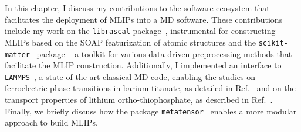 In this chapter, I discuss my contributions to the software ecosystem that facilitates the deployment of MLIPs into a MD software.
These contributions include my work on the \texttt{librascal} package~\cite{LIBRASCAL}, instrumental for constructing MLIPs based on the SOAP featurization of atomic structures and the \texttt{scikit-matter}~\cite{goscinski2023scikit} package -- a toolkit for various data-driven preprocessing methods that facilitate the MLIP construction. %
Additionally, I implemented an interface to \texttt{LAMMPS}~\cite{LAMMPS}, a state of the art classical MD code, enabling the studies on ferroelectric phase transitions in barium titanate, as detailed in Ref.~\cite{gigli2023modeling} and on the transport properties of lithium ortho-thiophosphate, as described in Ref.~\cite{gigli2023mechanism}.
Finally, we briefly discuss how the package \texttt{metatensor}~\cite{metatensor} enables a more modular approach to build MLIPs.

